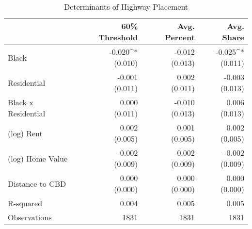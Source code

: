 \begin{table}[h]
\centering
\caption{Determinants of Highway Placement}
\label{tab:initial_results}
\begin{tabular*}{\textwidth}{@{\extracolsep{\fill}}l*{3}{r}}
\toprule
 & 60\% Threshold & Avg. Percent & Avg. Share \\
\midrule
Black & \makecell[tr]{-0.020^{*} \\ (0.010)} & \makecell[tr]{-0.012 \\ (0.013)} & \makecell[tr]{-0.025^{*} \\ (0.011)} \\
Residential & \makecell[tr]{-0.001 \\ (0.011)} & \makecell[tr]{0.002 \\ (0.011)} & \makecell[tr]{-0.003 \\ (0.013)} \\
Black x Residential & \makecell[tr]{0.000 \\ (0.011)} & \makecell[tr]{-0.010 \\ (0.013)} & \makecell[tr]{0.006 \\ (0.013)} \\
(log) Rent & \makecell[tr]{0.002 \\ (0.005)} & \makecell[tr]{0.001 \\ (0.005)} & \makecell[tr]{0.002 \\ (0.005)} \\
(log) Home Value & \makecell[tr]{-0.002 \\ (0.009)} & \makecell[tr]{-0.002 \\ (0.009)} & \makecell[tr]{-0.002 \\ (0.009)} \\
Distance to CBD & \makecell[tr]{0.000 \\ (0.000)} & \makecell[tr]{0.000 \\ (0.000)} & \makecell[tr]{0.000 \\ (0.000)} \\
R-squared & 0.004 & 0.005 & 0.005 \\
Observations & 1831 & 1831 & 1831 \\
\bottomrule
\end{tabular*}
\end{table}
